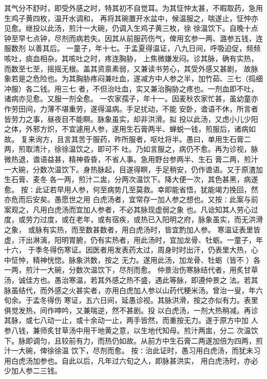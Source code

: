 \documentclass[a4paper,12pt,UTF8,twoside]{ctexbook}
\begin{document}
其气分不舒时，即受外感之时，特其初不自觉耳。为其怔忡太甚，不暇取药，急用生鸡子黄四枚，温开水调和， 
再将其碗置开水盆中，候温服之，喘遂止，怔忡亦见愈。继投以此汤，煎汁一大碗，仍调入生鸡子黄三枚，徐 
徐温饮下。自晚十点钟至早七点钟，尽剂而病若失。因其从前服药伤气，俾用玄参一两、潞参五钱，连服数剂 
以善其后。 
一童子，年十七。于孟夏得温证，八九日间，呼吸迫促，频频咳吐，痰血相杂。其咳吐之时，疼连胸胁， 
上焦微嫌发闷。诊其脉，确有实热，而数至七至，摇摇无根。盖其资禀素弱，又兼读书劳心，其受外感又甚剧， 
故脉象若是之危险也。为其胸胁疼闷兼吐血，遂减方中人参之半，加竹茹、三七（捣细冲服）各二钱。用三七 
者，不但治吐血，实又兼治胸胁之疼也。一剂血即不吐，诸病亦见愈。又服一剂全愈。 
一农家孺子，年十一。因麦秋农家忙甚，虽幼童亦作劳田间，力薄不堪重劳，遂得温病。手足扰动，不能 
安卧，谵语不休，所言者皆劳力之事，昼夜目不能瞑。脉象虽实，却非洪滑。拟 
投以此汤，又虑小儿少阳之体，外邪方炽，不宜遽用人参，遂用生石膏两半、蝉蜕一钱，煎服后，诸病如故。 
复来询方，且言其苦于服药，昨所服者，呕吐将半。愚曰，单用生石膏二两，煎取清汁，徐徐温饮之，即可不 
吐。乃如言服之，病仍不愈。再为诊视，脉微热退，谵语益甚，精神昏昏，不省人事。急用野台参两半、生石 
膏二两，煎汁一大碗，分数次温饮下。身热脉起，目遂得瞑，手足稍安，仍作谵语。又于原渣加生石膏、麦冬 
各一两，煎汁二盅，分两次温饮下。降大便一次，其色甚黑，病遂愈。 
按∶此证若早用人参，何至病势几至莫救。幸即能省悟，犹能竭力挽回，然亦危而后安矣。愚愿世之用 
白虎汤者，宜常存一加人参之想也。又按∶此案与前案观之，凡用白虎汤而宜加人参者，不必其脉现虚弱之象 
也。凡谂知其人劳心过度，或劳力过度，或在老年，或有宿疾，或热已入阳明之府，脉象虽实，而无洪滑之象， 
或脉有实热，而至数甚数者，用白虎汤时，皆宜酌加人参。 
寒温证表里皆虚，汗出淋漓，阳明胃腑，仍有实热者，用此汤时，宜加龙骨、牡蛎。一童子，年十六， 
于季冬得伤寒证。因医者用发表药太过，周身时时出汗，仍表里大热，心中怔忡，精神恍惚。脉象洪数，按之 
无力。遂用此汤，加龙骨、牡蛎（皆不 ）各一两，煎汁一大碗，分数次温饮下，尽剂而愈。 
仲景治伤寒脉结代者，用炙甘草汤，诚佳方也。愚治寒温，若其外感之热不盛，遇此等脉，即遵仲景之 
法。若其脉虽结代，而外感之火甚实者，亦用白虎加人参以山药代粳米汤。曾治一叟，年六旬余。于孟冬得伤 
寒证，五六日间，延愚诊视。其脉洪滑，按之亦似有力。表里俱觉发热，间作呻吟，又兼喘逆，然不甚剧。投 
以白虎汤，一剂大热稍减。再诊其脉，或七八动一止，或十余动一止，两手皆然，而重按无力。遂于原方中加 
人参八钱，兼师炙甘草汤中用干地黄之意，以生地代知母。煎汁两盅，分二 
次温饮下。脉即调匀，且较前有力，而热仍如故。从前方中生石膏二两遂加倍为四两，煎汁一大碗，俾徐徐温 
饮下，尽剂而愈。 
按∶治此证时，愚习用白虎汤，而犹未习用白虎汤加参也。自此以后，凡年过六旬之人，即脉甚洪实， 
用白虎汤时，亦必少加人参二三钱。 
\end{document}
